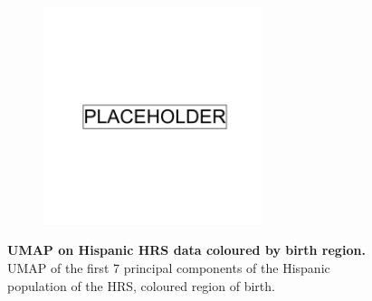 \begin{figure}[ht]
    \centering
    \begin{subfigure}{\textwidth}
    \includegraphics[width=0.7\textwidth]{placeholder.png}
    \end{subfigure}
    \caption[UMAP on Hispanic HRS data coloured by birth region]{\textbf{UMAP on Hispanic HRS data coloured by birth region.} UMAP of the first 7 principal components of the Hispanic population of the HRS, coloured region of birth.}
    \label{fig:supp_umap_hrs_hisp_birth}
\end{figure}

\newpage

